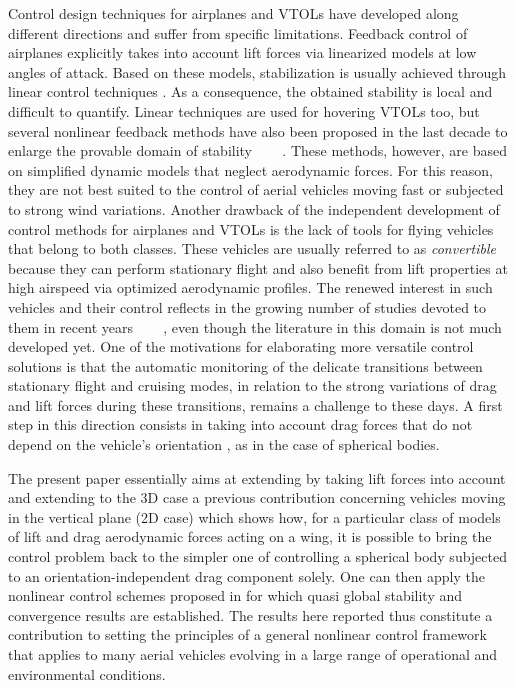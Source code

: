 \documentclass[twocolumn]{autart}
\theoremstyle{definition}
\theoremstyle{definition}
\begin{document}
Control design techniques for airplanes and VTOLs have developed along different directions and suffer from specific limitations. Feedback control of airplanes explicitly takes into account lift forces
via linearized models at low angles of attack. Based on these models, stabilization is usually achieved through
linear control techniques \cite{2004_STENGEL}. As a consequence, the obtained stability
is local and difficult to quantify. Linear techniques are
used for hovering VTOLs too, but several nonlinear feedback methods have also been proposed in the last decade to
enlarge the provable domain of stability ~\cite{2005_MCMFM} \cite{1992_HAUSER}~\cite{2003_RAG}~\cite{2002_MARCONI}. These methods, however, are based on simplified dynamic models that neglect aerodynamic forces. For this reason, they are not best suited to the control of aerial vehicles moving fast or subjected to strong wind variations.
Another drawback of the independent development of control methods for airplanes and VTOLs is the lack of tools
for flying vehicles that belong to both classes. These vehicles are usually referred to as \emph{convertible} because they can perform stationary flight and also benefit from lift
properties at high airspeed via optimized aerodynamic profiles. The renewed interest in such vehicles and their control reflects in the growing number of studies devoted to them
in recent years ~\cite{2007_BENOSMAN}~\cite{2007_FRANK} \cite{2011_NALDI}~\cite{1999_OISHI}, even though the literature in this domain is not much developed yet. One of the
motivations for elaborating more versatile control solutions is that the automatic monitoring of the delicate transitions between stationary flight and cruising modes, in relation to the strong variations of drag and lift forces during these transitions, remains a challenge to these days.
A first step in this direction consists in taking into account drag forces that do not depend on the vehicle's orientation \cite{2009_HUA}, as in the case of spherical bodies.

The present paper essentially aims at extending \cite{2009_HUA} by taking lift forces into account and extending to the 3D case a previous contribution \cite{2011_pucci} concerning vehicles moving in the vertical plane (2D case) which shows how, for a particular class of models of lift and drag aerodynamic forces acting on a wing, it is possible to bring the control problem back to the simpler one of controlling a spherical body subjected to an orientation-independent drag component solely. One can then apply the nonlinear control schemes proposed in \cite{2009_HUA} for which quasi global stability and convergence results are established. The results here reported  thus constitute a contribution to setting the principles of a general nonlinear control framework that applies to many aerial vehicles evolving in a large range of operational and environmental conditions.
\end{document}
